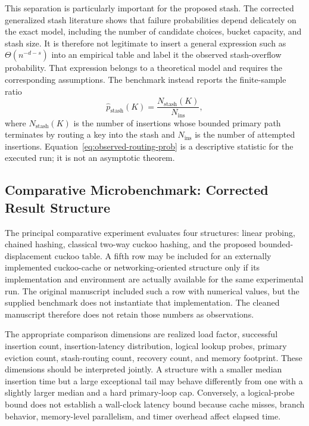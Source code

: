\documentclass[conference]{IEEEtran}
\begin{document}
This separation is particularly important for the proposed stash. The corrected generalized stash literature shows that failure probabilities depend delicately on the exact model, including the number of candidate choices, bucket capacity, and stash size. It is therefore not legitimate to insert a general expression such as $\Theta(n^{-d-s})$ into an empirical table and label it the observed stash-overflow probability. That expression belongs to a theoretical model and requires the corresponding assumptions. The benchmark instead reports the finite-sample ratio
\begin{equation}
\widehat{p}_{\mathrm{stash}}(K)
= \frac{N_{\mathrm{stash}}(K)}{N_{\mathrm{ins}}},
\label{eq:observed-routing-prob}
\end{equation}
where $N_{\mathrm{stash}}(K)$ is the number of insertions whose bounded primary path terminates by routing a key into the stash and $N_{\mathrm{ins}}$ is the number of attempted insertions. Equation~\eqref{eq:observed-routing-prob} is a descriptive statistic for the executed run; it is not an asymptotic theorem.

\subsection{Comparative Microbenchmark: Corrected Result Structure}
\label{subsec:comparative_results}

The principal comparative experiment evaluates four structures: linear probing, chained hashing, classical two-way cuckoo hashing, and the proposed bounded-displacement cuckoo table. A fifth row may be included for an externally implemented cuckoo-cache or networking-oriented structure only if its implementation and environment are actually available for the same experimental run. The original manuscript included such a row with numerical values, but the supplied benchmark does not instantiate that implementation. The cleaned manuscript therefore does not retain those numbers as observations.

The appropriate comparison dimensions are realized load factor, successful insertion count, insertion-latency distribution, logical lookup probes, primary eviction count, stash-routing count, recovery count, and memory footprint. These dimensions should be interpreted jointly. A structure with a smaller median insertion time but a large exceptional tail may behave differently from one with a slightly larger median and a hard primary-loop cap. Conversely, a logical-probe bound does not establish a wall-clock latency bound because cache misses, branch behavior, memory-level parallelism, and timer overhead affect elapsed time.
\end{document}
